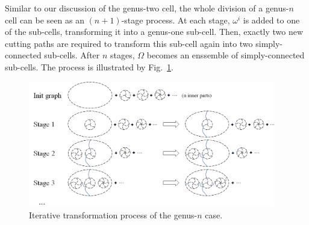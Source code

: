 \documentclass[Afour,sageh,times]{sagej}
\begin{document}
Similar to our discussion of the genus-two cell, the whole division of a genus-$n$ cell can be seen as an $(n+1)$-stage process. 
At each stage, $\omega^i$ is added to one of the sub-cells, transforming it into a genus-one sub-cell. Then, exactly two new cutting paths are required to transform this sub-cell again into two simply-connected sub-cells. 
After $n$ stages, $\Omega$ becomes an enssemble of simply-connected sub-cells. The process is illustrated 
by Fig.~\ref{fig_iterative_process}. 

\begin{figure}[t]
\centering
\includegraphics[width=0.96\textwidth]{figures/RSS_related_figures/proof/fig_iterative_process_2}
\caption{Iterative transformation process of the genus-$n$ case.}%
\label{fig_iterative_process}
\end{figure}
\end{document}
